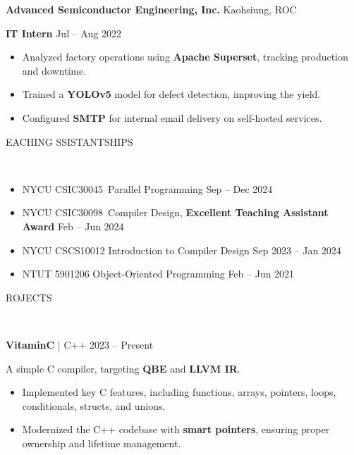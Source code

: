 \documentclass[11pt]{article}
\begin{document}
\textbf{Advanced Semiconductor Engineering, Inc.}   \hfill Kaohsiung, ROC

\textbf{IT Intern} \hfill Jul – Aug 2022
\begin{itemize}[noitemsep, topsep=0pt, partopsep=0pt, parsep=0pt, leftmargin=*]
    \item Analyzed factory operations using \textbf{Apache Superset}, tracking production and downtime.
    \item Trained a \textbf{YOLOv5} model for defect detection, improving the yield.
    \item Configured \textbf{SMTP} for internal email delivery on self-hosted services.
\end{itemize}

\begin{center}
    \scalebox{1.3}{T}EACHING \scalebox{1.3}{A}SSISTANTSHIPS\raggedright \,\hrulefill
\end{center}

\begin{itemize}[noitemsep, topsep=0pt, partopsep=0pt, parsep=0pt, leftmargin=*]
    \item NYCU CSIC30045 \,Parallel Programming \hfill Sep – Dec 2024
    \item NYCU CSIC30098 \,Compiler Design, \textbf{Excellent Teaching Assistant Award} \hfill Feb – Jun 2024
    \item NYCU CSCS10012 Introduction to Compiler Design \hfill Sep 2023 – Jan 2024
    \item NTUT 5901206 \enskip\quad Object-Oriented Programming \hfill Feb – Jun 2021
\end{itemize}

\begin{center}
    \scalebox{1.3}{P}ROJECTS\raggedright \,\hrulefill
\end{center}

\textbf{VitaminC} | C++ \hfill 2023 – Present

A simple C compiler, targeting \textbf{QBE} and \textbf{LLVM IR}.
\begin{itemize}[noitemsep, topsep=0pt, partopsep=0pt, parsep=0pt, leftmargin=*]
    \item Implemented key C features, including functions, arrays, pointers, loops, conditionals, structs, and unions.
    \item Modernized the C++ codebase with \textbf{smart pointers}, ensuring proper ownership and lifetime management.
\end{itemize}
\end{document}
